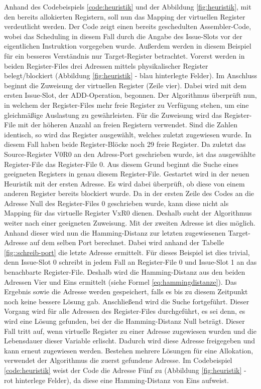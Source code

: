 Anhand des Codebeispiels \ref{code:heuristik} und der Abbildung \ref{fig:heuristik}, mit den bereits allokierten Registern, soll nun das Mapping der virtuellen Register verdeutlicht werden.
Der Code zeigt einen bereits geschedulten Assembler-Code, wobei das Scheduling in diesem Fall durch die Angabe des Issue-Slots vor der eigentlichen Instruktion vorgegeben wurde. Außerdem werden in diesem Beispiel für ein besseres Verständnis nur Target-Register betrachtet.
Vorerst werden in beiden Register-Files drei Adressen mittels physikalischer Register belegt/blockiert (Abbildung \ref{fig:heuristik} - blau hinterlegte Felder). Im Anschluss beginnt die Zuweisung der virtuellen Register (Zeile vier).
Dabei wird mit dem ersten Issue-Slot, der ADD-Operation, begonnen. Der Algorithmus überprüft nun, in welchem der Register-Files mehr freie Register zu Verfügung stehen, um eine gleichmäßige Auslastung zu gewährleisten. Für die Zuweisung wird das Register-File mit der höheren Anzahl an freien Registern verwendet. Sind die Zahlen identisch, so wird das Register ausgewählt, welches zuletzt zugewiesen wurde. In diesem Fall haben beide Register-Blöcke noch 29 freie Register. Da zuletzt das Source-Register V0R0 an den Adress-Port geschrieben wurde, ist das ausgewählte Register-File das Register-File 0.
Aus diesem Grund beginnt die Suche eines geeigneten Registers in genau diesem Register-File. Gestartet wird in der neuen Heuristik mit der ersten Adresse. Es wird dabei überprüft, ob diese von einem anderen Register bereits blockiert wurde. Da in der ersten Zeile des Codes an die Adresse Null des Register-Files 0 geschrieben wurde, kann diese nicht als Mapping für das virtuelle Register VxR0 dienen. Deshalb sucht der Algorithmus weiter nach einer geeigneten Zuweisung. Mit der zweiten Adresse ist dies möglich. Anhand dieser wird nun die Hamming-Distanz zur letzten zugewiesenen Target-Adresse auf dem selben Port berechnet. Dabei wird anhand der Tabelle \ref{fig::schreib-port} die letzte Adresse ermittelt. Für dieses Beispiel ist dies trivial, denn Issue-Slot 0 schreibt in jedem Fall an Register-File 0 und Issue-Slot 1 an das benachbarte Register-File. Deshalb wird die Hamming-Distanz aus den beiden Adressen Vier und Eins ermittelt (siehe Formel \ref{eq:hammingdistanze}). Das Ergebnis sowie die Adresse werden gespeichert, falls es bis zu diesem Zeitpunkt noch keine bessere Lösung gab. Anschließend wird die Suche fortgeführt. Dieser Vorgang wird für alle Adressen des Register-Files durchgeführt, es sei denn, es wird eine Lösung gefunden, bei der die Hamming-Distanz Null beträgt. Dieser Fall tritt auf, wenn virtuelle Register zu einer Adresse zugewiesen wurden und die Lebensdauer dieser Variable erlischt. Dadurch wird diese Adresse freigegeben und kann erneut zugewiesen werden.  Bestehen mehrere Lösungen für eine Allokation, verwendet der Algorithmus die zuerst gefundene Adresse. Im Codebeispiel \ref{code:heuristik} weist der Code die Adresse Fünf zu (Abbildung \ref{fig:heuristik} - rot hinterlege Felder), da diese eine Hamming-Distanz von Eins aufweist.
